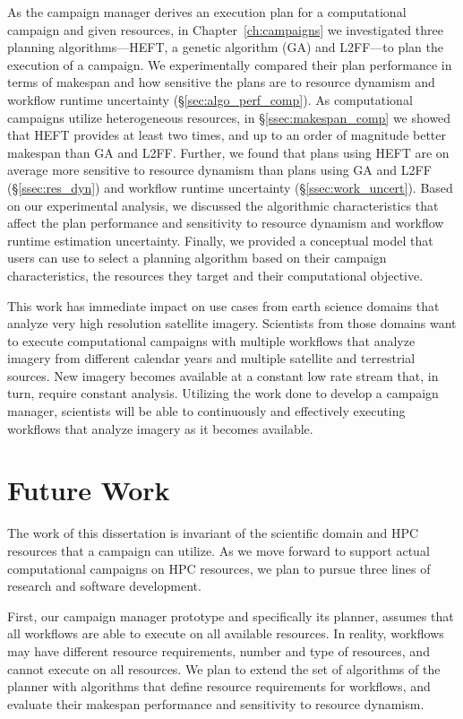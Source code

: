 As the campaign manager derives an execution plan for a computational campaign
and given resources, in Chapter~\ref{ch:campaigns} we investigated three
planning algorithms---HEFT, a genetic algorithm (GA) and L2FF---to plan the
execution of a campaign. We experimentally compared their plan performance in
terms of makespan and how sensitive the plans are to resource dynamism and
workflow runtime uncertainty (\S\ref{sec:algo_perf_comp}). As computational
campaigns utilize heterogeneous resources, in \S\ref{ssec:makespan_comp} we
showed that HEFT provides at least two times, and up to an order of magnitude
better makespan than GA and L2FF. Further, we found that plans using HEFT are on average 
more sensitive to resource dynamism than plans using GA and L2FF
(\S\ref{ssec:res_dyn}) and workflow runtime uncertainty
(\S\ref{ssec:work_uncert}). Based on our experimental analysis, we discussed
the algorithmic characteristics that affect the plan performance and
sensitivity to resource dynamism and workflow runtime estimation uncertainty.
Finally, we provided a conceptual model that users can use to select a
planning algorithm based on their campaign characteristics, the resources they
target and their computational objective.

This work has immediate impact on use cases from earth science domains that
analyze very high resolution satellite imagery. Scientists from those domains
want to execute computational campaigns with multiple workflows that analyze
imagery from different calendar years and multiple satellite and terrestrial
sources. New imagery becomes available at a constant low rate stream that, in
turn, require constant analysis. Utilizing the work done to develop a campaign
manager, scientists will be able to continuously and effectively executing
workflows that analyze imagery as it becomes available.

\section{Future Work}

The work of this dissertation is invariant of the scientific domain and HPC
resources that a campaign can utilize. As we move forward to support actual
computational campaigns on HPC resources, we plan to pursue three lines of
research and software development.

First, our campaign manager prototype and specifically its planner, assumes that
all workflows are able to execute on all available resources. In reality,
workflows may have different resource requirements, number and type of
resources, and cannot execute on all resources. We plan to extend the set of
algorithms of the planner with algorithms that define resource requirements for
workflows, and evaluate their makespan performance and sensitivity to resource
dynamism.

